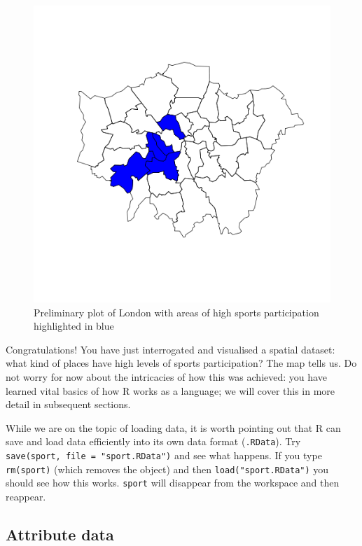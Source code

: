 \documentclass[]{article}
\begin{document}
\begin{figure}[htbp]
\centering
\includegraphics{figure/Preliminary_plot_of_London_with_areas_of_high_sports_participation_highlighted_in_blue.png}
\caption{Preliminary plot of London with areas of high
sports participation highlighted in blue}
\end{figure}

Congratulations! You have just interrogated and visualised a spatial
dataset: what kind of places have high levels of sports participation?
The map tells us. Do not worry for now about the intricacies of how this
was achieved: you have learned vital basics of how R works as a
language; we will cover this in more detail in subsequent sections.

While we are on the topic of loading data, it is worth pointing out that
R can save and load data efficiently into its own data format
(\texttt{.RData}). Try \texttt{save(sport, file = "sport.RData")} and
see what happens. If you type \texttt{rm(sport)} (which removes the
object) and then \texttt{load("sport.RData")} you should see how this
works. \texttt{sport} will disappear from the workspace and then
reappear.

\subsection{Attribute data}\label{attribute-data}
\end{document}
